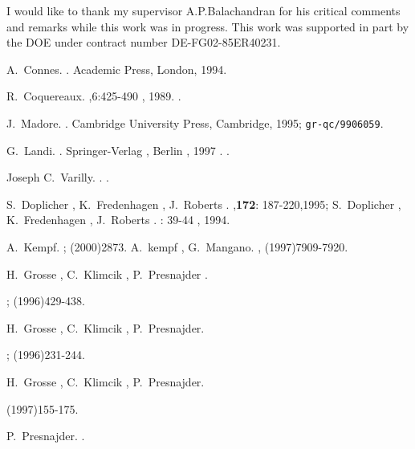 \documentclass[a4paper,12pt]{article}
\begin{document}
\vskip 5mm  \vskip 5mm
\noindent I would like to thank my supervisor A.P.Balachandran for
his critical comments and remarks while this work was in progress.
This work  was supported in part by the DOE under contract number
DE-FG02-85ER40231.



\begin{thebibliography}{10}
A.~Connes.
.
\newblock Academic Press, London, 1994.

R.~Coquereaux.
,6:425-490 , 1989.
.

J.~Madore.
.
\newblock Cambridge University Press, Cambridge, 1995;
{\tt gr-qc/9906059}.

G.~Landi.
.
\newblock Springer-Verlag , Berlin , 1997 .
.

Joseph C.~Varilly.
.
.


S.~Doplicher , K.~Fredenhagen , J.~Roberts .
,{\bf 172}: 187-220,1995;
S.~Doplicher , K.~Fredenhagen , J.~Roberts .
 : 39-44 , 1994.

A.~Kempf.
;
(2000)2873.
A.~kempf , G.~Mangano.
,
(1997)7909-7920.

H.~Grosse , C.~Klimcik , P.~Presnajder .

;
(1996)429-438.

H.~Grosse , C.~Klimcik , P.~Presnajder.

;
(1996)231-244.

H.~Grosse , C.~Klimcik , P.~Presnajder.

(1997)155-175.


P.~Presnajder.
.



\end{thebibliography}
\end{document}
